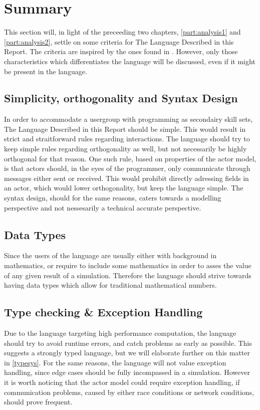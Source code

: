 \section{Summary}\label{analsum}

This section will, in light of the preceeding two chapters, \cref{part:analysis1} and \cref{part:analysis2}, settle on some criteria for The Language Described in this Report. The criteria are inspired by the ones found in . However, only those characteristics which differentiates the language will be discussed, even if it might be present in the language.


\subsection{Simplicity, orthogonality and Syntax Design}

In order to accommodate a usergroup with programming as secondairy skill sets, The Language Described in this Report should be simple. This would result in strict and straitforward rules regarding interactions. The language should try to keep simple rules regarding orthogonality as well, but not necessarily be highly orthogonal for that reason. One such rule, based on properties of the actor model, is that actors should, in the eyes of the programmer, only communicate through messages either sent or received. This would prohibit directly adressing fields in an actor, which would lower orthogonality, but keep the language simple. The syntax design, should for the same reasons, caters towards a modelling perspective and not nessesarily a technical accurate perspective.


\subsection{Data Types}

Since the users of the language are usually either with background in mathematics, or require to include some mathematics in order to asses the value of any given result of a simulation. Therefore the language should strive towards having data types which allow for traditional mathematical numbers.


\subsection{Type checking & Exception Handling}

Due to the language targeting high performance computation, the language should try to avoid runtime errors, and catch problems as early as possible. This suggests a strongly typed language, but we will elaborate further on this matter in \cref{typesys}. For the same reasons, the language will not value exception handling, since edge cases should be fully incompassed in a simulation. However it is worth noticing that the actor model could require exception handling, if communication problems, caused by either race conditions or network conditions, should prove frequent.




